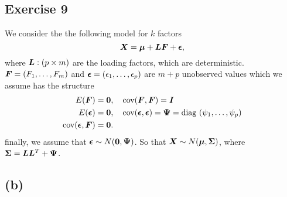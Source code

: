 \subsection*{Exercise 9}
\label{sec:exercise-9}

We consider the the following model for $k$ factors
\begin{equation*}
  \bm{X} = \bm{\mu}  + \bm{LF} + \bm{\epsilon},
\end{equation*}
where $\bm{L}: (p\times m)$ are the loading factors, which are
deterministic. $\bm{F} = (F_{1}, \dots, F_{m})$ and $\bm{\epsilon} =
(\epsilon_{1}, \dots, \epsilon_{p})$ are $m + p$ unobserved
values which we assume has the structure
\begin{align*}
  E(\bm{F}) &= \bm{0},\quad \text{cov}(\bm{F},\bm{F}) = \bm{I} \\
  E(\bm{\epsilon}) &= \bm{0},\quad \text{cov}(\bm{\epsilon},\bm{\epsilon})  = \bm{\Psi} =
  \text{diag }(\psi_{1}, \dots, \psi_{p})
\\
  \text{cov}(\bm{\epsilon},\bm{F}) &= \bm{0}.
\end{align*}
finally, we assume that $\bm{\epsilon} \sim N(\bm{0}, \bm{\Psi})$. So that
$\bm{X} \sim N(\bm{\mu}, \bm{\Sigma})$, where $\bm{\Sigma} = \bm{L} \bm{L} ^{T} +
\bm{\Psi}$. 
\subsection*{(b)}
\label{sec:b-8}

